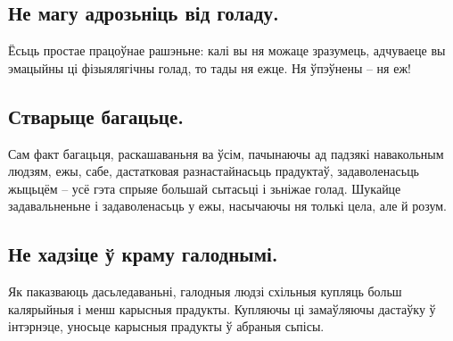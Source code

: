 \subsection{Не магу адрозьніць від голаду.}
Ёсьць простае працоўнае рашэньне: калі вы ня можаце зразумець, адчуваеце вы эмацыйны ці фізыялягічны голад, то тады ня ежце. Ня ўпэўнены – ня еж!

\subsection{Стварыце багацьце.}
Сам факт багацьця, раскашаваньня ва ўсім, пачынаючы ад падзякі навакольным людзям, ежы, сабе, дастатковая разнастайнасьць прадуктаў, задаволенасьць жыцьцём – усё гэта спрыяе большай сытасьці і зьніжае голад. Шукайце задавальненьне і задаволенасьць у ежы, насычаючы ня толькі цела, але й розум.

\subsection{Не хадзіце ў краму галоднымі.}
Як паказваюць дасьледаваньні, галодныя людзі схільныя купляць больш калярыйныя і менш карысныя прадукты. Купляючы ці замаўляючы дастаўку ў інтэрнэце, уносьце карысныя прадукты ў абраныя сьпісы.
